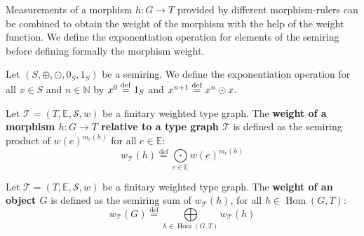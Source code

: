 Measurements of a morphism \(h: G \to T\) provided by different morphism-rulers can be combined to obtain the weight of the morphism with the help of the weight function. We define the exponentiation operation for elements of the semiring before defining formally the morphism weight.
\begin{notation} 
    \label{wfs:def:exponentiation}
Let $(S, \oplus, \odot, 0_S, 1_S)$ be a semiring. We define the exponentiation operation for all $x \in S$ and $n \in \mathbb{N}$ by
   $ x^0 \overset{\operatorname{def}}{=} 1_S$ and $x^{n+1} \overset{\operatorname{def}}{=} x^n \odot x$.
\end{notation}
\begin{definition}
    \label{def:weight_of_a_morphism_relative_to_a_type_graph}
        Let $\mathcal{T}=(T,\mathbb{E},\mathcal{S},w)$ be a finitary weighted type graph.
         The \textbf{weight of a morphism $h: G \rightarrow T$ relative to a type graph $\mathcal{T}$} is defined as the semiring product of $w(e)^{m_e(h)}$ for all $e \in \mathbb{E}$:
        \[  w_{\mathcal{T}}(h) \overset{\operatorname{def}}{=} \underset{e \in \mathbb{E}}{\bigodot} 
                w(e)^{m_e(h)} \]
\end{definition}
\begin{definition}
    \label{def:weight_of_an_object_relative_to_a_type_graph}
       Let $\mathcal{T}=(T,\mathbb{E},\mathcal{S},w)$ be a finitary weighted type graph. The \textbf{weight of an object \( G \)} is defined as the semiring sum of $w_\mathcal{T}(h)$, for all \( h \in \operatorname{Hom}(G,T) \):
        \[ w_\mathcal{T}(G) \overset{\operatorname{def}}{=} \underset{h \in \operatorname{Hom}(G,T)}{\bigoplus}  w_\mathcal{T}(h) \]
\end{definition}

